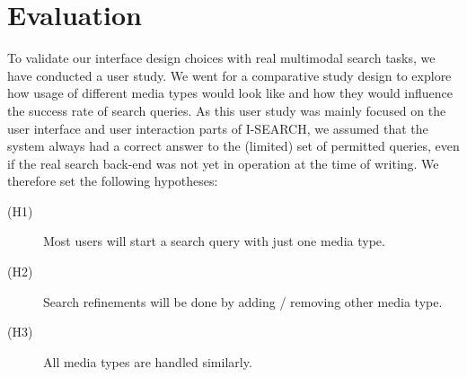 \documentclass[runningheads,a4paper]{llncs} \usepackage[utf8]{inputenc}
\begin{document}
\section{Evaluation}
To validate our interface design choices with real multimodal search tasks, we have conducted a user study. We went for a comparative study design to explore how usage of different media types would look like and how they would influence the success rate of search queries. As this user study was mainly focused on the user interface and user interaction parts of \mbox{I-SEARCH}, we assumed that the system always had a correct answer to the (limited) set of permitted queries, even if the real search back-end was not yet in operation at the time of writing. We therefore set the following hypotheses:
\begin{description}
  \item [(H1)] Most users will start a search query with just one media type.
  \item [(H2)] Search refinements will be done by adding / removing other media type.
  \item [(H3)] All media types are handled similarly.
\end{description}
\end{document}

